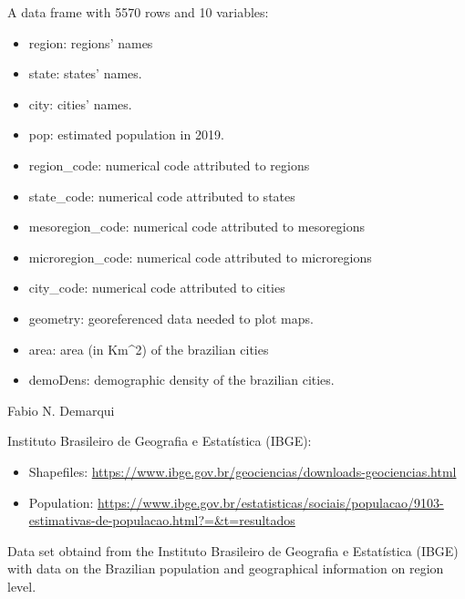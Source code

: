 \documentclass[letterpaper]{book}
\begin{document}
\begin{Format}
A data frame with 5570 rows and 10 variables:
\begin{itemize}

\item{} region: regions' names
\item{} state: states' names.
\item{} city: cities' names.
\item{} pop: estimated population in 2019.
\item{} region\_code: numerical code attributed to regions
\item{} state\_code: numerical code attributed to states
\item{} mesoregion\_code: numerical code attributed to mesoregions
\item{} microregion\_code: numerical code attributed to microregions
\item{} city\_code: numerical code attributed to cities
\item{} geometry: georeferenced data needed to plot maps.
\item{} area: area (in Km\textasciicircum{}2) of the brazilian cities
\item{} demoDens: demographic density of the brazilian cities.

\end{itemize}

\end{Format}
%
\begin{Author}\relax
Fabio N. Demarqui 
\end{Author}
%
\begin{Source}\relax
Instituto Brasileiro de Geografia e Estatística (IBGE):
\begin{itemize}

\item{} Shapefiles: \url{https://www.ibge.gov.br/geociencias/downloads-geociencias.html}
\item{} Population: \url{https://www.ibge.gov.br/estatisticas/sociais/populacao/9103-estimativas-de-populacao.html?=&t=resultados}

\end{itemize}

\end{Source}
%
\begin{Description}\relax
Data set obtaind from the Instituto Brasileiro de Geografia e Estatística (IBGE) with data on the Brazilian population and geographical information on region level.
\end{Description}
\end{document}
